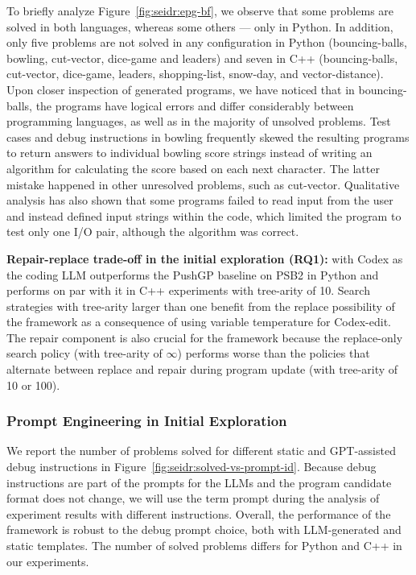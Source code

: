 To briefly analyze Figure~\ref{fig:seidr:epg-bf}, we observe that some problems are solved in both languages, whereas some others --- only in Python. 
In addition, only five problems are not solved in any \method{} configuration in Python (bouncing-balls, bowling, cut-vector, dice-game and leaders) and seven in C++ (bouncing-balls, cut-vector, dice-game,  leaders, shopping-list, snow-day, and vector-distance).
Upon closer inspection of generated programs, we have noticed that in bouncing-balls, the programs have logical errors and differ considerably between programming languages, as well as in the majority of unsolved problems. 
Test cases and debug instructions in bowling frequently skewed the resulting programs to return answers to individual bowling score strings instead of writing an algorithm for calculating the score based on each next character.
The latter mistake happened in other unresolved problems, such as cut-vector.
Qualitative analysis has also shown that some programs failed to read input from the user and instead defined input strings within the code, which limited the program to test only one I/O pair, although the algorithm was correct.

\begin{framed}
\noindent
\textbf{Repair-replace trade-off in the initial exploration (RQ1):} 
\method{} with Codex as the coding LLM outperforms the PushGP baseline on PSB2 in Python and performs on par with it in C++ experiments with tree-arity of 10. 
Search strategies with tree-arity larger than one benefit from the replace possibility of the \method{} framework as a consequence of using variable temperature for Codex-edit.
The repair component is also crucial for the framework because the replace-only search policy (with tree-arity of $\infty$) performs worse than the policies that alternate between replace and repair during program update (with tree-arity of 10 or 100).  
\end{framed} 


\subsubsection{Prompt Engineering in Initial Exploration}
We report the number of problems solved for different static and GPT-assisted debug instructions in Figure~\ref{fig:seidr:solved-vs-prompt-id}. 
Because debug instructions are part of the prompts for the LLMs and the program candidate format does not change, we will use the term prompt during the analysis of experiment results with different instructions.
Overall, the performance of the framework is robust to the debug prompt choice, both with LLM-generated and static templates. 
The number of solved problems differs for Python and C++ in our experiments.

